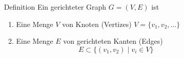 \begin{frame}
\begin{columns}[t,onlytextwidth]
\begin{column}{0.44\textwidth}
\begin{center}
\begin{tikzpicture}[>=latex,thick]
\end{tikzpicture}
\end{center}
\end{column}
\begin{column}{0.52\textwidth}
\begin{block}{Definition}
Ein gerichteter Graph $G=(V,E)$ ist
\begin{enumerate}
\item<2-> Eine Menge $V$ von Knoten (Vertizes)
$V=\{v_1,v_2,\dots\}$
\item<3->
Eine Menge $E$ von gerichteten Kanten
(Edges)
\[
E\subset \{ (v_1,v_2)\;|\; v_i\in V\}
\]
\end{enumerate}
\end{block}
\vspace{-30pt}
\end{column}
\end{columns}
\end{frame}
\egroup
